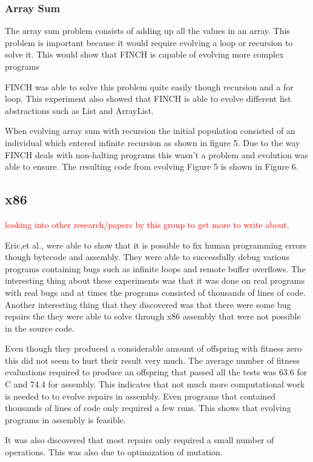\documentclass{sig-alternate}
\newcommand{\mycomment}[1]{\textcolor{red}{#1}}
\begin{document}
\subsubsection{Array Sum}
The array sum problem consists of adding up all the values in an array. This problem is important because it would require evolving a loop or recursion to solve it. This would show that FINCH is capable of evolving more complex programs\par
FINCH was able to solve this problem quite easily though recursion and a for loop. This experiment also showed that FINCH is able to evolve different list abstractions such as List and ArrayList.

When evolving array sum with recursion the initial population consisted of an individual which entered infinite recursion as shown in figure 5. Due to the way FINCH deals with non-halting programs this wasn't a problem and evolution was able to ensure. The resulting code from evolving Figure 5 is shown in Figure 6.


\subsection{x86}
\mycomment{looking into other research/papers by this group to get more to write about.}

Eric,et al., were able to show that it is possible to fix human programming errors though bytecode and assembly. They were able to successfully debug various programs containing bugs such as infinite loops and remote buffer overflows. The interesting thing about these experiments was that it was done on real programs with real bugs and at times the programs consisted of thousands of lines of code. Another interesting thing that they discovered was that there were some bug repairs the they were able to solve through x86 assembly that were not possible in the source code. 

Even though they produced a considerable amount of offspring with fitness zero this did not seem to hurt their result very much. The average number of fitness evaluations required to produce an offspring that passed all the tests was 63.6 for C and 74.4 for assembly. This indicates that not much more computational work is needed to to evolve repairs in assembly. Even programs that contained thousands of lines of code only required a few runs. This shows that evolving programs in assembly is feasible.

It was also discovered that most repairs only required a small number of operations. This was also due to optimization of mutation. 
\end{document}

